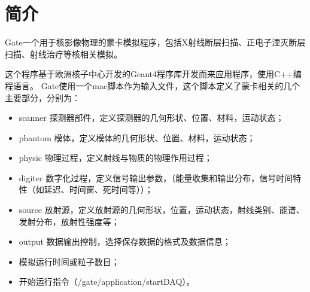 
\chapter{简介}

Gate一个用于核影像物理的蒙卡模拟程序，包括X射线断层扫描、正电子湮灭断层扫描、射线治疗等核相关模拟。

这个程序基于欧洲核子中心开发的Geant4程序库开发而来应用程序，使用C++编程语言。
Gate使用一个mac脚本作为输入文件，这个脚本定义了蒙卡相关的几个主要部分，分别为：

\begin{itemize}
	\item scanner  探测器部件，定义探测器的几何形状、位置、材料，运动状态；
	\item phantom  模体，定义模体的几何形状、位置、材料，运动状态；
	\item physic  物理过程，定义射线与物质的物理作用过程；
	\item digiter  数字化过程，定义信号输出参数，（能量收集和输出分布，信号时间特性（如延迟、时间窗、死时间等））；
	\item source  放射源，定义放射源的几何形状，位置，运动状态，射线类别、能谱、发射分布，放射性强度等；
	\item output 数据输出控制，选择保存数据的格式及数据信息；
	\item 模拟运行时间或粒子数目；
	\item 开始运行指令（/gate/application/startDAQ）。
\end{itemize}

